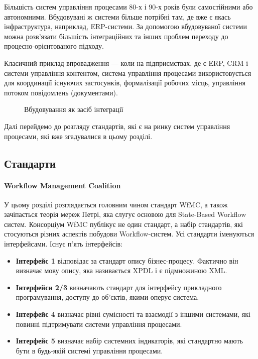 \documentclass{memoir}
\begin{document}
Більшість систем управління процесами 80-х і 90-х років були самостійними або автономними. Вбудовувані ж системи більше потрібні там, де вже є якась інфраструктура, наприклад, ERP-системи. За допомогою вбудовуваної системи можна розв’язати більшість інтеграційних та інших проблем переходу до процесно-орієнтованого підходу.

Класичний приклад впровадження — коли на підприємствах, де є ERP, CRM і системи управління контентом, система управління процесами використовується для координації існуючих застосунків, формалізації робочих місць, управління потоком повідомлень (документами).

\begin{figure}[h]
    \centering
    \caption{Вбудовування як засіб інтеграції}
    \label{fig:embedded_wf}
\end{figure}

Далі перейдемо до розгляду стандартів, які є на ринку систем управління процесами, які вже згадувалися в цьому розділі.

\subsection{Стандарти}

\paragraph{Workflow Management Coalition}

У цьому розділі розглядається головним чином стандарт WfMC, а також зачіпається теорія мереж Петрі, яка слугує основою для State-Based Workflow систем. Консорціум WfMC публікує не один стандарт, а набір стандартів, які стосуються різних аспектів побудови Workflow-систем. Усі стандарти іменуються інтерфейсами. Існує п’ять інтерфейсів:

\begin{itemize}
    \item \textbf{Інтерфейс 1} відповідає за стандарт опису бізнес-процесу. Фактично він визначає мову опису, яка називається XPDL і є підмножиною XML.
    \item \textbf{Інтерфейси 2/3} визначають стандарт для інтерфейсу прикладного програмування, доступу до об’єктів, якими оперує система.
    \item \textbf{Інтерфейс 4} визначає рівні сумісності та взаємодії з іншими системами, які повинні підтримувати системи управління процесами.
    \item \textbf{Інтерфейс 5} визначає набір системних індикаторів, які стандартно мають бути в будь-якій системі управління процесами.
\end{itemize}
\end{document}
